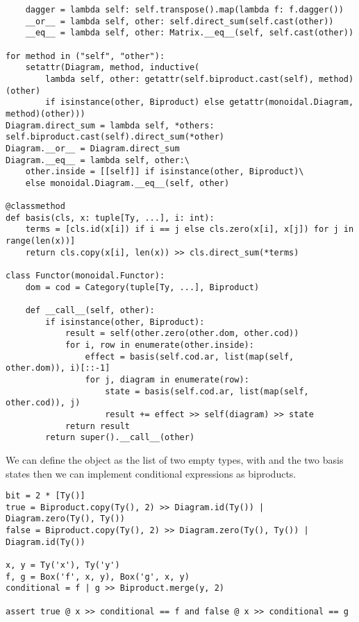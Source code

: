 \begin{python}
\begin{verbatim}
    dagger = lambda self: self.transpose().map(lambda f: f.dagger())
    __or__ = lambda self, other: self.direct_sum(self.cast(other))
    __eq__ = lambda self, other: Matrix.__eq__(self, self.cast(other))

for method in ("self", "other"):
    setattr(Diagram, method, inductive(
        lambda self, other: getattr(self.biproduct.cast(self), method)(other)
        if isinstance(other, Biproduct) else getattr(monoidal.Diagram, method)(other)))
Diagram.direct_sum = lambda self, *others: self.biproduct.cast(self).direct_sum(*other)
Diagram.__or__ = Diagram.direct_sum
Diagram.__eq__ = lambda self, other:\
    other.inside = [[self]] if isinstance(other, Biproduct)\
    else monoidal.Diagram.__eq__(self, other)

@classmethod
def basis(cls, x: tuple[Ty, ...], i: int):
    terms = [cls.id(x[i]) if i == j else cls.zero(x[i], x[j]) for j in range(len(x))]
    return cls.copy(x[i], len(x)) >> cls.direct_sum(*terms)

class Functor(monoidal.Functor):
    dom = cod = Category(tuple[Ty, ...], Biproduct)

    def __call__(self, other):
        if isinstance(other, Biproduct):
            result = self(other.zero(other.dom, other.cod))
            for i, row in enumerate(other.inside):
                effect = basis(self.cod.ar, list(map(self, other.dom)), i)[::-1]
                for j, diagram in enumerate(row):
                    state = basis(self.cod.ar, list(map(self, other.cod)), j)
                    result += effect >> self(diagram) >> state
            return result
        return super().__call__(other)
\end{verbatim}
\end{python}

\begin{example}
We can define the object  as the list of two empty types, with  and  the two basis states
then we can implement conditional expressions as biproducts.

\begin{verbatim}
bit = 2 * [Ty()]
true = Biproduct.copy(Ty(), 2) >> Diagram.id(Ty()) | Diagram.zero(Ty(), Ty())
false = Biproduct.copy(Ty(), 2) >> Diagram.zero(Ty(), Ty()) | Diagram.id(Ty())

x, y = Ty('x'), Ty('y')
f, g = Box('f', x, y), Box('g', x, y)
conditional = f | g >> Biproduct.merge(y, 2)

assert true @ x >> conditional == f and false @ x >> conditional == g
\end{verbatim}
\end{example}

